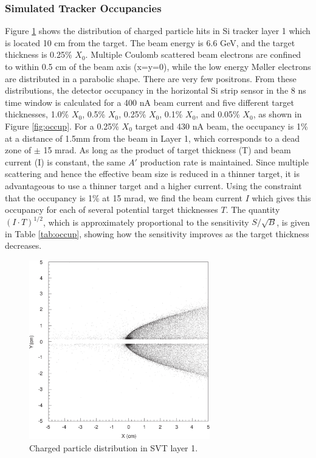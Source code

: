 \subsubsection{Simulated Tracker Occupancies}

Figure \ref{fig:scatt} shows the distribution of charged particle hits in Si tracker layer 1 
which is located 
10 cm from the target. The beam energy is 6.6 GeV, and the target thickness is 
0.25\% $X_0$. Multiple Coulomb scattered beam electrons are confined to within 0.5 cm of the beam axis
(x=y=0), while the low energy M{\o}ller electrons are distributed in a parabolic shape. There are
very few positrons. From these distributions, the detector occupancy in the horizontal Si strip
sensor in the 8 ns time window is calculated for a 400 nA beam current and five different target
thicknesses, 1.0\% $X_0$, 0.5\% $X_0$, 0.25\% $X_0$, 0.1\% $X_0$, and 0.05\% $X_0$, as shown
in Figure \ref{fig:occup}. 
For a 0.25\% $X_0$ target and 430 nA beam, the occupancy is 
1\% at a distance of 1.5mm from the beam in Layer 1, which corresponds to a dead zone of $\pm$ 15
mrad. As long as the product of target thickness (T) and beam current (I) is constant, the same 
$A'$ production rate is maintained. Since multiple scattering and hence the effective beam size 
is reduced in a thinner target, it is advantageous to use a thinner target and a higher current.
Using the constraint that the occupancy is 1\% at 15 mrad, we find the beam current $I$ which 
gives this occupancy for each of several potential target thicknesses $T$. The quantity 
$(I\cdot T)^{1/2}$, which is approximately proportional to the sensitivity $S/\sqrt{B}$, is
given in Table \ref{tab:occup}, showing how the sensitivity improves as the target thickness 
decreases.

\begin{figure}[h]
\includegraphics[width= 0.7\textwidth]{performance/scatterplot.pdf}
\caption{\small{Charged particle distribution in SVT layer 1.}}
\label{fig:scatt}
\end{figure}


